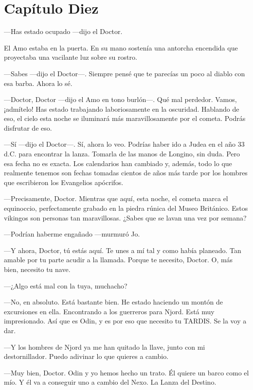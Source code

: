 \chapter*{Capítulo Diez}

---Has estado ocupado ---dijo el Doctor.

El Amo estaba en la puerta. En su mano sostenía una antorcha encendida
que proyectaba una vacilante luz sobre su rostro.

---Sabes ---dijo el Doctor---. Siempre pensé que te parecías un poco al
diablo con esa barba. Ahora lo sé.

---Doctor, Doctor ---dijo el Amo en tono burlón---. Qué mal perdedor.
Vamos, ¡admítelo! Has estado trabajando laboriosamente en la oscuridad.
Hablando de eso, el cielo esta noche se iluminará más maravillosamente
por el cometa. Podrás disfrutar de eso.

---Sí ---dijo el Doctor---. Sí, ahora lo veo. Podrías haber ido a Judea
en el año 33 d.C. para encontrar la lanza. Tomarla de las manos de
Longino, sin duda. Pero esa fecha no es exacta. Los calendarios han
cambiado y, además, todo lo que realmente tenemos son fechas tomadas
cientos de años más tarde por los hombres que escribieron los Evangelios
apócrifos.

---Precisamente, Doctor. Mientras que aquí, esta noche, el cometa marca
el equinoccio, perfectamente grabado en la piedra rúnica del Museo
Británico. Estos vikingos son personas tan maravillosas. ¿Sabes que se
lavan una vez por semana?

---Podrían haberme engañado ---murmuró Jo.

---Y ahora, Doctor, tú estás aquí. Te unes a mí tal y como había
planeado. Tan amable por tu parte acudir a la llamada. Porque te
necesito, Doctor. O, más bien, necesito tu nave.

---¿Algo está mal con la tuya, muchacho?

---No, en absoluto. Está bastante bien. He estado haciendo un montón de
excursiones en ella. Encontrando a los guerreros para Njord. Está muy
impresionado. Así que es Odin, y es por eso que necesito tu TARDIS. Se
la voy a dar.

---Y los hombres de Njord ya me han quitado la llave, junto con mi
destornillador. Puedo adivinar lo que quieres a cambio.

---Muy bien, Doctor. Odin y yo hemos hecho un trato. Él quiere un barco
como el mío. Y él va a conseguir uno a cambio del Nexo. La Lanza del
Destino.

